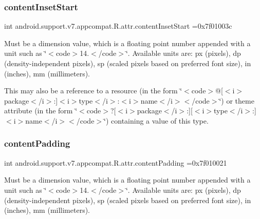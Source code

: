 \subsubsection{\texorpdfstring{content\+Inset\+Start}{contentInsetStart}}
{\footnotesize\ttfamily int android.\+support.\+v7.\+appcompat.\+R.\+attr.\+content\+Inset\+Start =0x7f01003c\hspace{0.3cm}{\ttfamily [static]}}

Must be a dimension value, which is a floating point number appended with a unit such as \char`\"{}$<$code$>$14.\+5sp$<$/code$>$\char`\"{}. Available units are\+: px (pixels), dp (density-\/independent pixels), sp (scaled pixels based on preferred font size), in (inches), mm (millimeters). 

This may also be a reference to a resource (in the form \char`\"{}$<$code$>$@\mbox{[}$<$i$>$package$<$/i$>$\+:\mbox{]}$<$i$>$type$<$/i$>$\+:$<$i$>$name$<$/i$>$$<$/code$>$\char`\"{}) or theme attribute (in the form \char`\"{}$<$code$>$?\mbox{[}$<$i$>$package$<$/i$>$\+:\mbox{]}\mbox{[}$<$i$>$type$<$/i$>$\+:\mbox{]}$<$i$>$name$<$/i$>$$<$/code$>$\char`\"{}) containing a value of this type. \mbox{\label{classandroid_1_1support_1_1v7_1_1appcompat_1_1R_1_1attr_ac9b82d0a6109c603a1761c5f3da4c700}} 
\subsubsection{\texorpdfstring{content\+Padding}{contentPadding}}
{\footnotesize\ttfamily int android.\+support.\+v7.\+appcompat.\+R.\+attr.\+content\+Padding =0x7f010021\hspace{0.3cm}{\ttfamily [static]}}

Must be a dimension value, which is a floating point number appended with a unit such as \char`\"{}$<$code$>$14.\+5sp$<$/code$>$\char`\"{}. Available units are\+: px (pixels), dp (density-\/independent pixels), sp (scaled pixels based on preferred font size), in (inches), mm (millimeters). 

